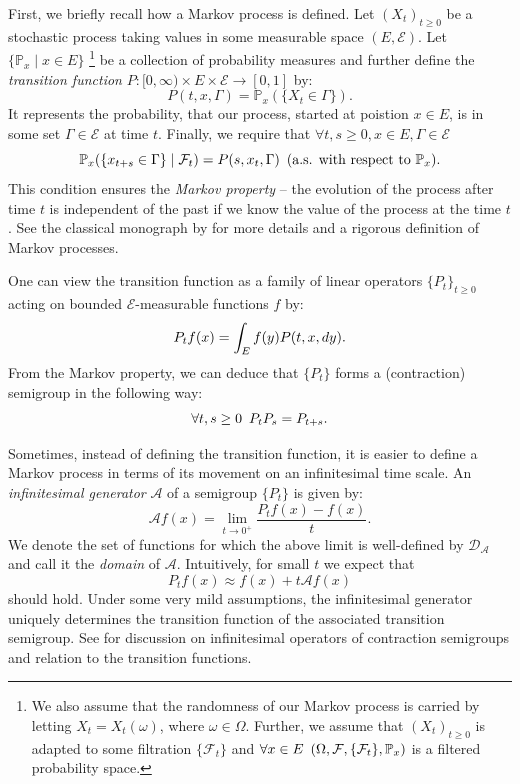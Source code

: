 \documentclass[report.tex]{subfiles}
\begin{document}
First, we briefly recall how a Markov process is defined.
Let $(X_{t})_{t \geq 0}$ be a stochastic process
taking values in some measurable space $(E, \mathcal{E})$.
Let $\{\mathbb{P}_{x} \mid x \in E \}$
\footnote{
  We also assume that the randomness of our Markov process is carried by
  letting $X_{t} = X_{t}(\omega)$, where $\omega \in \Omega$. Further, we assume
  that $(X_{t})_{t \geq 0}$ is adapted to some filtration $\{\mathcal{F}_{t}\}$
  and $\forall x\nobreak\in\nobreak E \enskip
  (\Omega, \mathcal{F}, \{\mathcal{F}_{t}\}, \mathbb{P}_{x})$
  is a filtered probability space.
}
be a collection of probability measures and further define the \textit{transition function}
\mbox{$P : \mathbb[0, \infty) \times E \times \mathcal{E} \to [0, 1]$} by:
$$P(t, x, \Gamma) = \mathbb{P}_{x}(\{X_{t} \in \Gamma\}).$$
It represents the probability, that our
process, started at poistion $x \in E$,
is in some set $\Gamma \in \mathcal{E}$ at time $t$.
Finally, we require that
$\forall t,s \geq 0, x \in E, \Gamma \in \mathcal{E}$
$$\mathbb{P}_{x}(\{x_{t+s} \in \Gamma\} \mid \mathcal{F}_{t}) = P(s, x_{t}, \Gamma)
  \enskip \text{(a.s. with respect to $\mathbb{P}_{x}$)}.$$
This condition ensures the \textit{Markov property} -- the evolution of the process
after time $t$ is independent of the past if we know the value of the process
at the time $t$. See the classical monograph by
\citet[Chapter 3]{dynkin1965markov} for more details and a rigorous definition
of Markov processes.

One can view the transition function as a family of linear operators
$\{P_{t}\}_{t \geq 0}$ acting on bounded $\mathcal{E}$-measurable functions $f$
by:
$$P_{t}f(x) = \int_{{E}}^{{}} {f(y)P(t, x, dy)}.$$
From the Markov property, we can deduce that $\{P_{t}\}$ forms a (contraction)
semigroup in the following way:
$$\forall t,s \geq 0 \enskip P_{t}P_{s} = P_{t+s}.$$

Sometimes, instead of defining the transition function,
it is easier to define a Markov process in terms of its movement on
an infinitesimal time scale. An \textit{infinitesimal generator} $\mathcal{A}$
of a semigroup $\{P_{t}\}$ is given by:
\begin{equation}
  \label{infinitesimal-generator-definition}
  \mathcal{A}f(x) = \lim_{t \to 0^{+}} \frac{P_{t}f(x) - f(x)}{t}.
\end{equation}
We denote the set of functions for which the above limit is well-defined by
$\mathcal{D}_{\mathcal{A}}$ and call it the \textit{domain} of $\mathcal{A}$.
Intuitively, for small $t$ we expect that
$$P_{t}f(x) \approx f(x) + t\mathcal{A}f(x)$$
should hold.
Under some very
mild assumptions, the infinitesimal generator uniquely determines the
transition function of the associated transition semigroup. See
\cite[Chapters 1 and 2]{dynkin1965markov}
for discussion on infinitesimal
operators of contraction semigroups and relation to the transition functions.
\end{document}
